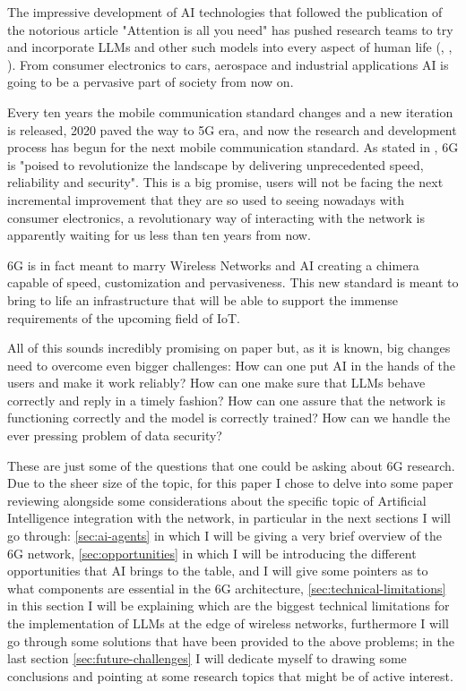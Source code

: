 

The impressive development of AI technologies that followed the publication of the notorious article
"Attention is all you need"\cite{attention} has pushed research teams to try and incorporate LLMs
and other such models into every aspect of human life (\cite{6ainets}, \cite{metaverse}, \cite{pga}). From consumer electronics to cars, aerospace
and industrial applications AI is going to be a pervasive part of society from now on.

Every ten years the mobile communication standard changes and a new iteration is released, 2020
paved the way to 5G era, and now the research and development process has begun for the next mobile
communication standard. As stated in \cite{6ainets}, 6G is "poised to revolutionize the landscape by
delivering unprecedented speed, reliability and security". This is a big promise, users will not be
facing the next incremental improvement that they are so used to seeing nowadays with consumer
electronics, a revolutionary way of interacting with the network is apparently waiting for us less
than ten years from now.

6G is in fact meant to marry Wireless Networks and AI creating a chimera capable of speed,
customization and pervasiveness. This new standard is meant to bring to life an infrastructure that
will be able to support the immense requirements of the upcoming field of IoT.

\bigskip

All of this sounds incredibly promising on paper but, as it is known, big changes need to overcome even
bigger challenges: How can one put AI in the hands of the users and make it work reliably? How can
one make sure that LLMs behave correctly and reply in a timely fashion? How can one
assure that the network is functioning correctly and the model is correctly trained? How can we
handle the ever pressing problem of data security?

These are just some of the questions that one could be asking about 6G research. Due to the sheer size of the topic, for this
paper I chose to delve into some paper reviewing alongside some considerations about the specific
topic of Artificial Intelligence integration with the network, in particular in the next sections I
will go through: \ref{sec:ai-agents} in which I will be giving a very brief
overview of the 6G network, \ref{sec:opportunities} in
which I will be introducing the different opportunities that AI brings to the table, and I will
give some pointers as to what components are essential in the 6G architecture, \ref{sec:technical-limitations} in this section I will be explaining which are the biggest technical limitations for the implementation of LLMs at the edge of wireless networks, furthermore I will go through some solutions that have been provided to the above problems; in the last section \ref{sec:future-challenges} I will dedicate myself to drawing some
conclusions and pointing at some research topics that might be of active interest.
